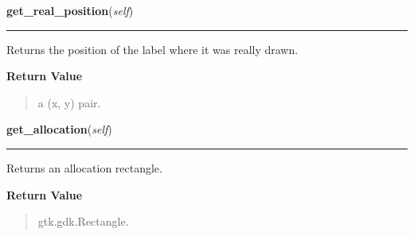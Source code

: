     \label{pygtk_chart:label:Label:get_real_position}

    \vspace{0.5ex}

\hspace{.8\funcindent}\begin{boxedminipage}{\funcwidth}

    \raggedright \textbf{get\_real\_position}(\textit{self})

    \vspace{-1.5ex}

    \rule{\textwidth}{0.5\fboxrule}
\setlength{\parskip}{2ex}
    Returns the position of the label where it was really drawn.

\setlength{\parskip}{1ex}
      \textbf{Return Value}
    \vspace{-1ex}

      \begin{quote}
      a (x, y) pair.

      \end{quote}

    \end{boxedminipage}

    \label{pygtk_chart:label:Label:get_allocation}

    \vspace{0.5ex}

\hspace{.8\funcindent}\begin{boxedminipage}{\funcwidth}

    \raggedright \textbf{get\_allocation}(\textit{self})

    \vspace{-1.5ex}

    \rule{\textwidth}{0.5\fboxrule}
\setlength{\parskip}{2ex}
    Returns an allocation rectangle.

\setlength{\parskip}{1ex}
      \textbf{Return Value}
    \vspace{-1ex}

      \begin{quote}
      gtk.gdk.Rectangle.

      \end{quote}

    \end{boxedminipage}

